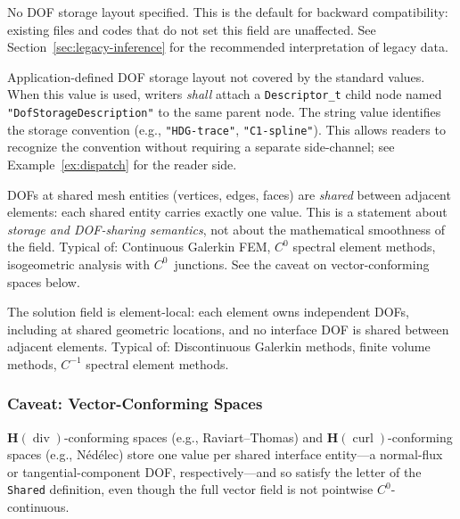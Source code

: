 \documentclass[11pt,letterpaper]{article}
\begin{document}
\begin{description}[leftmargin=2em]
\item[\texttt{DofStorageNull}] No DOF storage layout specified.
  This is the default for backward compatibility: existing
  files and codes that do not set this field are unaffected.
  See Section~\ref{sec:legacy-inference} for the recommended
  interpretation of legacy data.

\item[\texttt{DofStorageUserDefined}] Application-defined DOF storage
  layout not covered by the standard values.  When this value is
  used, writers \emph{shall} attach a \texttt{Descriptor\_t} child
  node named \texttt{"DofStorageDescription"} to the same parent
  node.  The string value identifies
  the storage convention (e.g.,
  \texttt{"HDG-trace"}, \texttt{"C1-spline"}).  This allows readers
  to recognize the convention without requiring a separate
  side-channel; see Example~\ref{ex:dispatch} for the reader side.

\item[\texttt{Shared}] DOFs at shared mesh entities
  (vertices, edges, faces) are \emph{shared} between adjacent
  elements: each shared entity carries exactly one value.  This is
  a statement about \emph{storage and DOF-sharing semantics}, not
  about the mathematical smoothness of the field.
  Typical of: Continuous Galerkin FEM,
  $C^0$ spectral element methods, isogeometric analysis with
  $C^0$~junctions.  See the caveat on vector-conforming spaces below.

\item[\texttt{Independent}] The solution field is
  element-local: each element owns independent DOFs, including at
  shared geometric locations, and no interface DOF is shared between
  adjacent elements.  Typical of: Discontinuous Galerkin methods,
  finite volume methods, $C^{-1}$ spectral element methods.
\end{description}

\subsubsection{Caveat: Vector-Conforming Spaces}
\label{sec:hdiv-hcurl}

$\boldsymbol{H}(\operatorname{div})$-conforming spaces
(e.g., Raviart--Thomas) and $\boldsymbol{H}(\operatorname{curl})$-conforming spaces
(e.g., N\'{e}d\'{e}lec) store one value per shared interface entity---a normal-flux
or tangential-component DOF, respectively---and so satisfy the letter of the
\texttt{Shared} definition, even though the full vector field is not
pointwise $C^0$-continuous.
\end{document}
